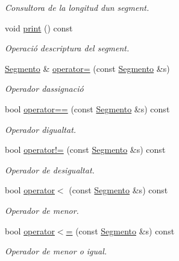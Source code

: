 \begin{DoxyCompactItemize}
\begin{DoxyCompactList}\small\item\em Consultora de la longitud d\textquotesingle{}un segment. \end{DoxyCompactList}\item 
void \hyperlink{class_segmento_ac6f9e53987e915d2d0b6847aeb8e49ed}{print} () const
\begin{DoxyCompactList}\small\item\em Operació d\textquotesingle{}escriptura del segment. \end{DoxyCompactList}\item 
\hyperlink{class_segmento}{Segmento} \& \hyperlink{class_segmento_aee5b332a00494aa3963fe5a1496ab3f4}{operator=} (const \hyperlink{class_segmento}{Segmento} \&s)
\begin{DoxyCompactList}\small\item\em Operador d\textquotesingle{}assignació \end{DoxyCompactList}\item 
bool \hyperlink{class_segmento_a1f1e5977425950af37d4ca52761d381a}{operator==} (const \hyperlink{class_segmento}{Segmento} \&s) const
\begin{DoxyCompactList}\small\item\em Operador d\textquotesingle{}igualtat. \end{DoxyCompactList}\item 
bool \hyperlink{class_segmento_a77db9ed1b0a50b2cc1783c57a25f359a}{operator!=} (const \hyperlink{class_segmento}{Segmento} \&s) const
\begin{DoxyCompactList}\small\item\em Operador de desigualtat. \end{DoxyCompactList}\item 
bool \hyperlink{class_segmento_a780e43a2c06be2e098753cd5133f630b}{operator$<$} (const \hyperlink{class_segmento}{Segmento} \&s) const
\begin{DoxyCompactList}\small\item\em Operador de menor. \end{DoxyCompactList}\item 
bool \hyperlink{class_segmento_acc183ac638eab6f484d17ced4f66cf8e}{operator$<$=} (const \hyperlink{class_segmento}{Segmento} \&s) const
\begin{DoxyCompactList}\small\item\em Operador de menor o igual. \end{DoxyCompactList}\item 

\end{DoxyCompactItemize}
